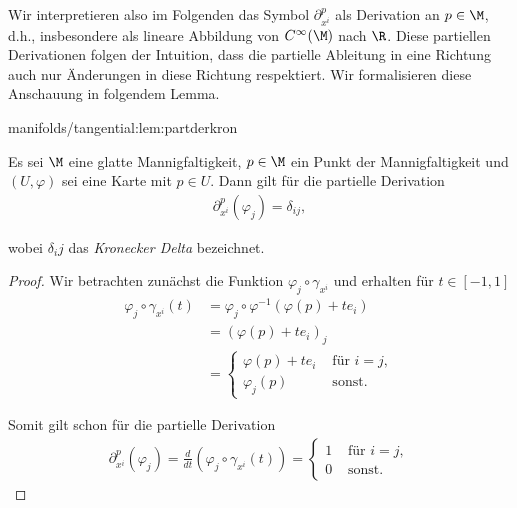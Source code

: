 \documentclass[letterpaper,10pt,german]{jupyterBook}
\begin{document}
\par
Wir interpretieren also im Folgenden das Symbol \(\partial_{x^{i}}^p\) als Derivation an \(p\in\M\), d.h., insbesondere als lineare Abbildung von \(C^\infty(\M)\) nach \(\R\).
Diese partiellen Derivationen folgen der Intuition, dass die partielle Ableitung in eine Richtung auch nur Änderungen in diese Richtung respektiert.
Wir formalisieren diese Anschauung in folgendem Lemma.
\begin{lemma}{}{manifolds/tangential:lem:partderkron}



\par
Es sei \(\M\) eine glatte Mannigfaltigkeit, \(p\in\M\) ein Punkt der Mannigfaltigkeit und \((U,\varphi)\) sei eine Karte mit \(p\in U\).
Dann gilt für die partielle Derivation
\begin{align*}
\partial_{x^i}^p(\varphi_j) = \delta_{ij},
\end{align*}
\par
wobei \(\delta_ij\) das \emph{Kronecker Delta} bezeichnet.
\end{lemma}

\begin{proof}
 Wir betrachten zunächst die Funktion \(\varphi_j \circ \gamma_{x^i}\) und erhalten für \(t\in [-1,1]\)
\begin{align*}
\varphi_j \circ \gamma_{x^i}(t)
&= \varphi_j \circ \varphi^{-1}(\varphi(p) + t e_i)\\
&= (\varphi(p) + t e_i)_j\\ 
&=
\begin{cases}
\varphi(p) + t e_i &\text{ für } i=j,\\
\varphi_j(p)&\text{ sonst}.
\end{cases}
\end{align*}
\par
Somit gilt schon für die partielle Derivation
\begin{align*}
\partial_{x^i}^p(\varphi_j)=
\frac{d}{dt} (\varphi_j \circ \gamma_{x^i}(t)) = 
\begin{cases}
1&\text{ für } i=j,\\
0&\text{ sonst}.
\end{cases}
\end{align*}\end{proof}
\end{document}
